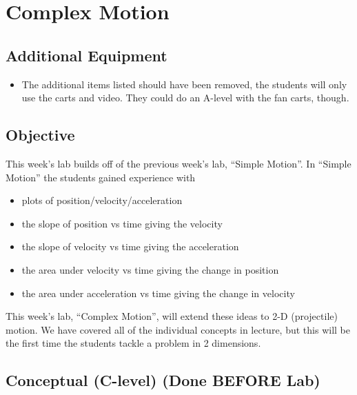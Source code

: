 \documentclass[fleqn,letterpaper]{article}
\begin{document}
\cfoot{}
\headsep=25pt

\section*{Complex Motion}

\subsection*{Additional Equipment}

\begin{itemize}
  \item{The additional items listed should have been removed, the students will only use the carts and video.  They could do an A-level with the fan carts, though.}
\end{itemize}

\subsection*{Objective}

This week's lab builds off of the previous week's lab, ``Simple Motion''.  In ``Simple Motion'' the students gained experience with
%
\begin{itemize}
 \item{plots of position/velocity/acceleration}
 \item{the slope of position vs time giving the velocity}
 \item{the slope of velocity vs time giving the acceleration}
 \item{the area under velocity vs time giving the change in position}
 \item{the area under acceleration vs time giving the change in velocity}
\end{itemize}
%
This week's lab, ``Complex Motion'', will extend these ideas to 2-D (projectile) motion.  We have covered all of the individual concepts in lecture, but this will be the first time the students tackle a problem in 2 dimensions.


\subsection*{Conceptual (C-level) (Done BEFORE Lab)}
\end{document}
